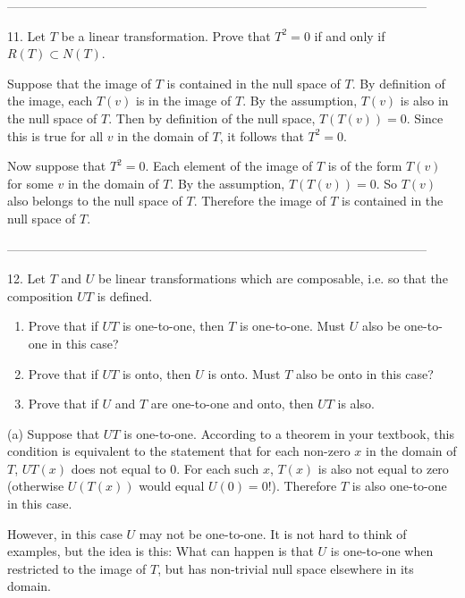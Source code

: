 \documentclass[12pt]{amsart}
\begin{document}
\noindent-----------------------------------------------------------------------------------------------------


11.  Let $T$ be a linear transformation.  Prove that $T^2 = 0$ if and only if $R(T)\subset N(T)$.

\vspace{1pc}

Suppose that the image of $T$ is contained in the null space of $T$.  By definition of the image, each $T(v)$ is in the image of $T$.  By the assumption, $T(v)$ is also in the null space of $T$.  Then by definition of the null space, $T(T(v))=0$.  Since this is true for all $v$ in the domain of $T$, it follows that $T^2=0$.

Now suppose that $T^2=0$.  Each element of the image of $T$ is of the form $T(v)$ for some $v$ in the domain of $T$.  By the assumption, $T(T(v)) = 0$.  So $T(v)$ also belongs to the null space of $T$.  Therefore the image of $T$ is contained in the null space of $T$.

\noindent-----------------------------------------------------------------------------------------------------

12.  Let $T$ and $U$ be linear transformations which are composable, i.e. so that the composition $UT$ is defined.

\begin{enumerate}[label=(\alph*)]
\item{Prove that if $UT$ is one-to-one, then $T$ is one-to-one.  Must $U$ also be one-to-one in this case?}
\item{Prove that if $UT$ is onto, then $U$ is onto.  Must $T$ also be onto in this case?}
\item{Prove that if $U$ and $T$ are one-to-one and onto, then $UT$ is also.}
\end{enumerate}

(a) Suppose that $UT$ is one-to-one.  According to a theorem in your textbook, this condition is equivalent to the statement that for each non-zero $x$ in the domain of $T$, $UT(x)$ does not equal to $0$.  For each such $x$, $T(x)$ is also not equal to zero (otherwise $U(T(x))$ would equal $U(0)=0$!).  Therefore $T$ is also one-to-one in this case.

However, in this case $U$ may not be one-to-one.  It is not hard to think of examples, but the idea is this: What can happen is that $U$ is one-to-one when restricted to the image of $T$, but has non-trivial null space elsewhere in its domain.
\end{document}
